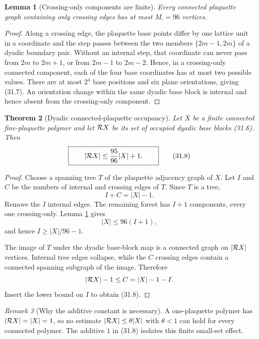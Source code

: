 \documentclass[11pt,oneside]{book}
\newtheorem{theorem}{Theorem}[chapter]
\newtheorem{lemma}[theorem]{Lemma}
\theoremstyle{definition}
\theoremstyle{remark}
\newtheorem{remark}[theorem]{Remark}
\begin{document}
\begin{lemma}[Crossing-only components are finite]
\label{lem:e8v31-crossing-component}
Every connected plaquette graph containing only crossing edges has at
most \(M_\square=96\) vertices.
\end{lemma}

\begin{proof}
Along a crossing edge, the plaquette base points differ by one lattice
unit in a coordinate and the step passes between the two members
\(\{2m-1,2m\}\) of a dyadic boundary pair.  Without an internal step,
that coordinate can never pass from \(2m\) to \(2m+1\), or from
\(2m-1\) to \(2m-2\).  Hence, in a crossing-only connected component,
each of the four base coordinates has at most two possible values.
There are at most \(2^4\) base positions and six plane orientations,
giving (31.7).  An orientation change within the same dyadic base
block is internal and hence absent from the crossing-only component.
\end{proof}

\begin{theorem}[Dyadic connected-plaquette occupancy]
\label{thm:e8v31-occupancy}
Let \(X\) be a finite connected fine-plaquette polymer and let
\({\cal R}X\) be its set of occupied dyadic base blocks (31.6).  Then
\[
\boxed{\qquad
 |{\cal R}X|
 \leq\frac{95}{96}|X|+1.
\qquad}                                                           \tag{31.8}
\]
\end{theorem}

\begin{proof}
Choose a spanning tree \(T\) of the plaquette adjacency graph of \(X\).
Let \(I\) and \(C\) be the numbers of internal and crossing edges of
\(T\).  Since \(T\) is a tree,
\[
                              I+C=|X|-1.                          \tag{31.9}
\]
Remove the \(I\) internal edges.  The remaining forest has \(I+1\)
components, every one crossing-only.  Lemma
\ref{lem:e8v31-crossing-component} gives
\[
                              |X|\leq96(I+1),                     \tag{31.10}
\]
and hence \(I\geq|X|/96-1\).

The image of \(T\) under the dyadic base-block map is a connected graph on
\(|{\cal R}X|\) vertices.  Internal tree edges collapse, while the
\(C\) crossing edges contain a connected spanning subgraph of the
image.  Therefore
\[
 |{\cal R}X|-1\leq C=|X|-1-I.
\]
Insert the lower bound on \(I\) to obtain (31.8).
\end{proof}

\begin{remark}[Why the additive constant is necessary]
\label{rem:e8v31-additive}
A one-plaquette polymer has \(|{\cal R}X|=|X|=1\), so no estimate
\(|{\cal R}X|\leq\theta|X|\) with \(\theta<1\) can hold for every
connected polymer.  The additive \(1\) in (31.8) isolates this finite
small-set effect.
\end{remark}
\end{document}
